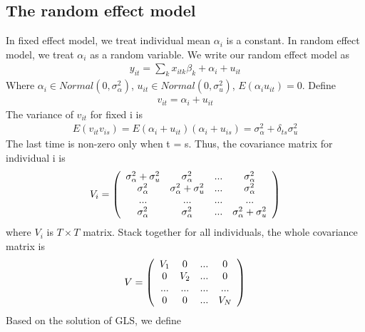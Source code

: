 \documentclass[a4paper]{article}
\begin{document}
\subsection{The random effect model}
In fixed effect model, we treat individual mean $\alpha_i$ is a constant. In random effect model, we treat $\alpha_i$ as a random variable. We write our random effect model as
\begin{align*}
y_{it} = \sum_k x_{itk}\beta_k + \alpha_i + u_{it}
\end{align*}
Where $\alpha_i \in Normal(0, \sigma_{\alpha}^2)$, $u_{it} \in Normal(0, \sigma^2_{u})$, $E(\alpha_i u_{it}) = 0$. 
Define
\begin{align*}
v_{it} = \alpha_i + u_{it}
\end{align*}
The variance of $v_{it}$ for fixed i is 
\begin{align*}
E(v_{it}v_{is}) = E(\alpha_i + u_{it})(\alpha_i + u_{is}) = \sigma^2_{\alpha} + \delta_{ts} \sigma^2_{u}
\end{align*}
The last time is non-zero only when t = s.
Thus, the covariance matrix for individual i is 
\begin{align*}
V_i = \left( \begin{array} {  c c c c } 
                   \sigma^2_{\alpha} + \sigma^2_{u} &  \sigma^2_{\alpha}  & ... &  \sigma^2_{\alpha}  \\
                   \sigma^2_{\alpha} & \sigma^2_{\alpha} + \sigma^2_{u} & ... & \sigma^2_{\alpha} \\
                  ... & ... & ...&...\\
                    \sigma^2_{\alpha} &  \sigma^2_{\alpha} & ... &\sigma^2_{\alpha} + \sigma^2_{u} \\
           \end{array} \right)
\end{align*}
where $V_i$ is  $T \times T$ matrix. Stack together for all individuals, the whole covariance matrix is
\begin{align*}
V =  \left( \begin{array} {  c c c c } 
                   V_1 &  0  & ... &  0  \\
                   0 & V_2& ... & 0 \\
                  ... & ... & ...&...\\
                  0 &  0 & ... & V_N\\
           \end{array} \right)
\end{align*}
Based on the solution of GLS, we define
\end{document}

